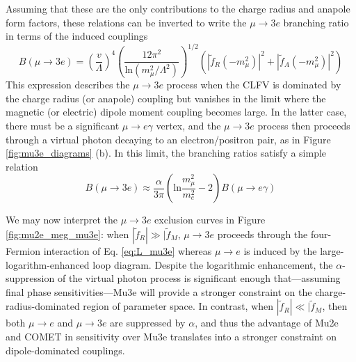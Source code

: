 \documentclass{book}[letterpaper,12pt]
\begin{document}
Assuming that these are the only contributions to the charge radius and anapole form factors, these relations can be inverted to write the $\mu\rightarrow 3e$ branching ratio in terms of the induced couplings
\begin{equation}
B(\mu\rightarrow 3e)=\left(\frac{v}{\Lambda}\right)^4\left(\frac{12\pi^2}{\mathrm{ln}\left(m_{\mu}^2/\Lambda^2\right)}\right)^{1/2}\left(|\tilde{f}_R(-m_{\mu}^2)|^2+|\tilde{f}_A(-m_{\mu}^2)|^2\right)
\end{equation}
This expression describes the $\mu\rightarrow 3e$ process when the CLFV is dominated by the charge radius (or anapole) coupling but vanishes in the limit where the magnetic (or electric) dipole moment coupling becomes large. In the latter case, there must be a significant $\mu\rightarrow e\gamma$ vertex, and the $\mu\rightarrow 3e$ process then proceeds through a virtual photon decaying to an electron/positron pair, as in Figure \ref{fig:mu3e_diagrams} (b). In this limit, the branching ratios satisfy a simple relation \cite{PhysRevD.53.2442}
\begin{equation}
B(\mu\rightarrow 3e)\approx \frac{\alpha}{3\pi}\left(\mathrm{ln}\frac{m_{\mu}^2}{m_e^2}-2\right)B(\mu\rightarrow e\gamma)
\end{equation}

We may now interpret the $\mu\rightarrow 3e$ exclusion curves in Figure \ref{fig:mu2e_meg_mu3e}: when $|\tilde{f}_R|\gg |\tilde{f}_M$, $\mu\rightarrow 3e$ proceeds through the four-Fermion interaction of Eq. \ref{eq:L_mu3e} whereas $\mu\rightarrow e$ is induced by the large-logarithm-enhanced loop diagram. Despite the logarithmic enhancement, the $\alpha$-suppression of the virtual photon process is significant enough that---assuming final phase sensitivities---Mu3e will provide a stronger constraint on the charge-radius-dominated region of parameter space. In contrast, when $|\tilde{f}_R|\ll |\tilde{f}_M$, then both $\mu\rightarrow e$ and $\mu\rightarrow 3e$ are suppressed by $\alpha$, and thus the advantage of Mu2e and COMET in sensitivity over Mu3e translates into a stronger constraint on dipole-dominated couplings. 
\end{document}
